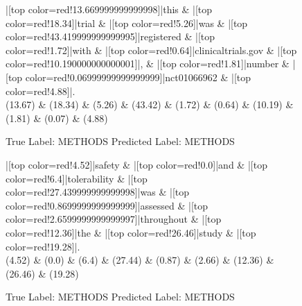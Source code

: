 \documentclass[a4paper, landscape]{article}
\begin{document}
\clearpage
\begin{figure}
\begin{center}
\begin{dependency}
\begin{deptext}
|[top color=red!13.669999999999998]|this \& |[top color=red!18.34]|trial \& |[top color=red!5.26]|was \& |[top color=red!43.419999999999995]|registered \& |[top color=red!1.72]|with \& |[top color=red!0.64]|clinicaltrials.gov \& |[top color=red!10.190000000000001]|, \& |[top color=red!1.81]|number \& |[top color=red!0.06999999999999999]|nct01066962 \& |[top color=red!4.88]|.\\
(13.67) \& (18.34) \& (5.26) \& (43.42) \& (1.72) \& (0.64) \& (10.19) \& (1.81) \& (0.07) \& (4.88)\\
\end{deptext}
\end{dependency}
\end{center}
\caption{True Label: METHODS Predicted Label: METHODS}
\end{figure}
\clearpage
\begin{figure}
\begin{center}
\begin{dependency}
\begin{deptext}
|[top color=red!4.52]|safety \& |[top color=red!0.0]|and \& |[top color=red!6.4]|tolerability \& |[top color=red!27.439999999999998]|was \& |[top color=red!0.8699999999999999]|assessed \& |[top color=red!2.6599999999999997]|throughout \& |[top color=red!12.36]|the \& |[top color=red!26.46]|study \& |[top color=red!19.28]|.\\
(4.52) \& (0.0) \& (6.4) \& (27.44) \& (0.87) \& (2.66) \& (12.36) \& (26.46) \& (19.28)\\
\end{deptext}
\end{dependency}
\end{center}
\caption{True Label: METHODS Predicted Label: METHODS}
\end{figure}
\end{document}
